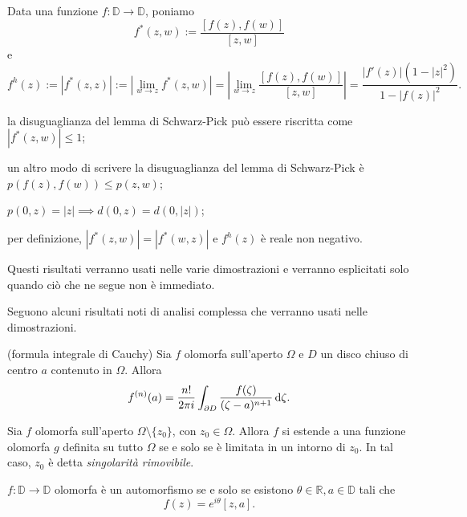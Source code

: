 \begin{defn}
  Data una funzione $f: \mathbb{D} \longrightarrow \mathbb{D}$, poniamo
  $$f^*(z,w):=\frac{[f(z),f(w)]}{[z,w]}$$
  e
  $$f^h(z):=|f^*(z,z)|:=\left|\lim_{w \longrightarrow z} f^*(z,w)\right|=\left|\lim_{w \longrightarrow z} \frac{[f(z),f(w)]}{[z,w]}\right|=\frac{|f'(z)|(1-|z|^2)}{1-|f(z)|^2}.$$
\end{defn}

\begin{oss}
  \begin{nlist}
    \item la disuguaglianza del lemma di Schwarz-Pick può essere riscritta come $|f^*(z,w)| \le 1$;
    \item  un altro modo di scrivere la disuguaglianza del lemma di Schwarz-Pick è $p(f(z),f(w)) \le p(z,w)$;
    \item $p(0,z)=|z| \implies d(0,z)=d(0,|z|)$;
    \item per definizione, $|f^*(z,w)|=|f^*(w,z)|$ e $f^h(z)$ è reale non negativo.
  \end{nlist}
  Questi risultati verranno usati nelle varie dimostrazioni e verranno esplicitati solo quando ciò che ne segue non è immediato.
\end{oss}

Seguono alcuni risultati noti di analisi complessa che verranno usati nelle dimostrazioni.

\begin{thm}
  (formula integrale di Cauchy) Sia $f$ olomorfa sull'aperto $\Omega$ e $D$ un disco chiuso di centro $a$ contenuto in $\Omega$. Allora
  \begin{equation}
    f^{(n)}(a)=\frac{n!}{2\pi i} \int_{\partial D} \frac{f(\zeta)}{(\zeta-a)^{n+1}}\mathop{}\!\mathrm{d}\zeta.
  \end{equation}
\end{thm}

\begin{prop}
  Sia $f$ olomorfa sull'aperto $\Omega \setminus\{z_0\}$, con $z_0 \in \Omega$. Allora $f$ si estende a una funzione olomorfa $g$ definita su tutto $\Omega$ se e solo se è limitata in un intorno di $z_0$. In tal caso, $z_0$ è detta \textit{singolarità rimovibile}.
\end{prop}

\begin{prop} \label{aut}
  $f:\mathbb{D} \longrightarrow \mathbb{D}$ olomorfa è un automorfismo se e solo se esistono $\theta \in \mathbb{R}, a \in \mathbb{D}$ tali che
  $$f(z)=e^{i\theta}[z,a].$$
\end{prop}
